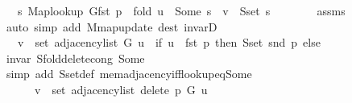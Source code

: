 \begin{isabellebody}
\ {\isachardoublequoteopen}{\isachardot}{\kern0pt}{\isachardot}{\kern0pt}{\isachardot}{\kern0pt}\ {\isasymlongleftrightarrow}\ {\isacharparenleft}{\kern0pt}{\isasymexists}s{\isachardot}{\kern0pt}\ {\isacharparenleft}{\kern0pt}Map{\isacharunderscore}{\kern0pt}lookup\ G{\isacharparenleft}{\kern0pt}fst\ p\ {\isasymmapsto}\ {\isacharquery}{\kern0pt}fold{\isacharparenright}{\kern0pt}{\isacharparenright}{\kern0pt}\ u\ {\isacharequal}{\kern0pt}\ Some\ s\ {\isasymand}\ v\ {\isasymin}\ S{\isachardot}{\kern0pt}set\ s{\isacharparenright}{\kern0pt}{\isachardoublequoteclose}\isanewline
\ \ \ \ \ \ \isamarkupfalse%
\ assms\isanewline
\ \ \ \ \ \ \isamarkupfalse%
\ {\isacharparenleft}{\kern0pt}auto\ simp\ add{\isacharcolon}{\kern0pt}\ M{\isachardot}{\kern0pt}map{\isacharunderscore}{\kern0pt}update\ dest{\isacharcolon}{\kern0pt}\ invarD{\isacharparenleft}{\kern0pt}{}{\isacharparenright}{\kern0pt}{\isacharparenright}{\kern0pt}\isanewline
\ \ \ \ \isamarkupfalse%
\ \isamarkupfalse%
\ {\isachardoublequoteopen}{\isachardot}{\kern0pt}{\isachardot}{\kern0pt}{\isachardot}{\kern0pt}\ {\isasymlongleftrightarrow}\ v\ {\isasymin}\ set\ {\isacharparenleft}{\kern0pt}adjacency{\isacharunderscore}{\kern0pt}list\ G\ u{\isacharparenright}{\kern0pt}\ {\isacharminus}{\kern0pt}\ {\isacharparenleft}{\kern0pt}if\ u\ {\isacharequal}{\kern0pt}\ fst\ p\ then\ S{\isachardot}{\kern0pt}set\ {\isacharparenleft}{\kern0pt}snd\ p{\isacharparenright}{\kern0pt}\ else\ {\isacharbraceleft}{\kern0pt}{\isacharbraceright}{\kern0pt}{\isacharparenright}{\kern0pt}{\isachardoublequoteclose}\isanewline
\ \ \ \ \ \ \isamarkupfalse%
\ invar\ S{\isachardot}{\kern0pt}fold{\isacharunderscore}{\kern0pt}delete{\isacharunderscore}{\kern0pt}cong\ Some\isanewline
\ \ \ \ \ \ \isamarkupfalse%
\ {\isacharparenleft}{\kern0pt}simp\ add{\isacharcolon}{\kern0pt}\ S{\isachardot}{\kern0pt}set{\isacharunderscore}{\kern0pt}def\ mem{\isacharunderscore}{\kern0pt}adjacency{\isacharunderscore}{\kern0pt}iff{\isacharunderscore}{\kern0pt}lookup{\isacharunderscore}{\kern0pt}eq{\isacharunderscore}{\kern0pt}Some{\isacharparenright}{\kern0pt}\isanewline
\ \ \ \ \isamarkupfalse%
\ \isamarkupfalse%
\isanewline
\ \ \ \ \ \ {\isachardoublequoteopen}v\ {\isasymin}\ set\ {\isacharparenleft}{\kern0pt}adjacency{\isacharunderscore}{\kern0pt}list\ {\isacharparenleft}{\kern0pt}delete{\isacharunderscore}{\kern0pt}{}\ p\ G{\isacharparenright}{\kern0pt}\ u{\isacharparenright}{\kern0pt}\ {\isasymlongleftrightarrow}\isanewline

\end{isabellebody}
